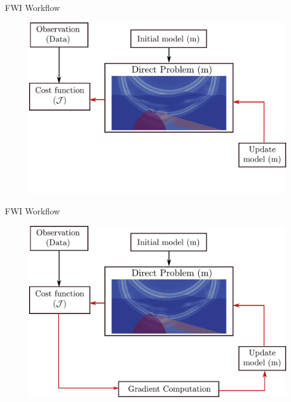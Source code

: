 \begin{frame}[noframenumbering]{FWI Workflow}
\begin{figure}
\includegraphics[scale=0.3]{image_inv_problem/pb_inv_workflow1.pdf}
\end{figure}
\end{frame}

\begin{frame}[noframenumbering]{FWI Workflow}
\begin{figure}
\includegraphics[scale=0.3]{image_inv_problem/pb_inv_workflow.pdf}
\end{figure}
\end{frame}

